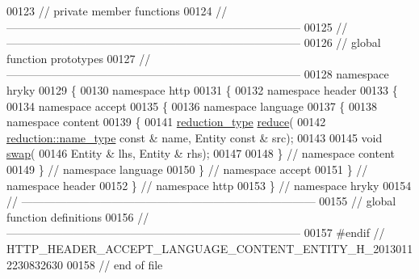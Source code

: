 \begin{DoxyCode}
00123 \textcolor{comment}{// private member functions}
00124 \textcolor{comment}{//
      ------------------------------------------------------------------------------}
00125 \textcolor{comment}{//
      ------------------------------------------------------------------------------}
00126 \textcolor{comment}{// global function prototypes}
00127 \textcolor{comment}{//
      ------------------------------------------------------------------------------}
00128 \textcolor{keyword}{namespace }hryky
00129 \{
00130 \textcolor{keyword}{namespace }http
00131 \{
00132 \textcolor{keyword}{namespace }header
00133 \{
00134 \textcolor{keyword}{namespace }accept
00135 \{
00136 \textcolor{keyword}{namespace }language
00137 \{
00138 \textcolor{keyword}{namespace }content
00139 \{
00141     \hyperlink{namespacehryky_a343a9a4c36a586be5c2693156200eadc}{reduction_type} \hyperlink{namespacehryky_1_1http_a08fc36a78a8e2908140fcd102829a566}{reduce}(
00142         \hyperlink{namespacehryky_1_1reduction_ac686c30a4c8d196bbd0f05629a6b921f}{reduction::name_type} \textcolor{keyword}{const} & name, Entity \textcolor{keyword}{const} & src);
00143 
00145     \textcolor{keywordtype}{void} \hyperlink{namespacehryky_1_1http_a38e62595ad532d18fbc65ceb61973aec}{swap}(
00146         Entity & lhs, Entity & rhs);
00147 
00148 \} \textcolor{comment}{// namespace content}
00149 \} \textcolor{comment}{// namespace language}
00150 \} \textcolor{comment}{// namespace accept}
00151 \} \textcolor{comment}{// namespace header}
00152 \} \textcolor{comment}{// namespace http}
00153 \} \textcolor{comment}{// namespace hryky}
00154 \textcolor{comment}{//
      ------------------------------------------------------------------------------}
00155 \textcolor{comment}{// global function definitions}
00156 \textcolor{comment}{//
      ------------------------------------------------------------------------------}
00157 \textcolor{preprocessor}{#endif // HTTP\_HEADER\_ACCEPT\_LANGUAGE\_CONTENT\_ENTITY\_H\_20130112230832630}
00158 \textcolor{preprocessor}{}\textcolor{comment}{// end of file}
\end{DoxyCode}
